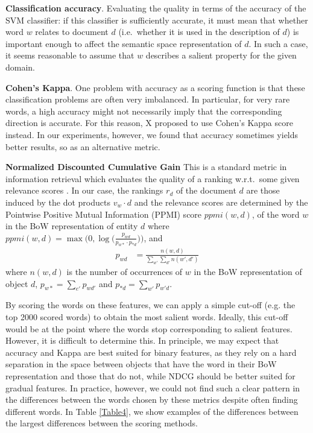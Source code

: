 \noindent \textbf{Classification accuracy}. Evaluating the quality in terms of the accuracy of the SVM classifier: if this classifier is sufficiently accurate, it must mean that whether word $w$ relates to document $d$ (i.e.\ whether it is used in the description of $d$) is important enough to affect the semantic space representation of $d$. In such a case, it seems reasonable to assume that $w$ describes a salient property for the given domain.%
\smallskip

\noindent \textbf{Cohen's Kappa}. One problem with accuracy as a scoring function is that these classification problems are often very imbalanced. In particular, for very rare words, a high accuracy might not necessarily imply that the corresponding direction is accurate. For this reason, X proposed to use Cohen's Kappa score instead. In our experiments, however, we found that accuracy sometimes yields better results, so  as an alternative metric. %
\smallskip

\noindent \textbf{Normalized Discounted Cumulative Gain} %
This is a standard metric in information retrieval which evaluates the quality of a ranking w.r.t.\ some given relevance scores \cite{jarvelin2002cumulated}.  In our case, the rankings $r_d$ of the document $d$ are those induced by the dot products $v_w \cdot d$ and the relevance scores are determined by the Pointwise Positive Mutual Information (PPMI) score $\textit{ppmi}(w,d)$, of the word $w$ in the BoW representation of entity $d$ where
$\textit{ppmi}(w,d) = \max \big(0, \log\big(\frac{p_{wd}}{p_{w*} \cdotp p_{*d}}\big)\big)$, and
\begin{align*}
p_{wd} &= \frac{n(w, d)}{\sum_{w'} \sum_{d'} n(w', d')}
\end{align*}
where $n(w,d)$ is the number of occurrences of $w$ in the BoW representation of object $d$, $p_{w*} = \sum_{e'} p_{wd'}$ and $p_{*d} = \sum_{w'} p_{w'd}$. %
\smallskip

By scoring the words on these features, we can apply a simple cut-off (e.g. the top 2000 scored words) to obtain the most salient words. Ideally, this cut-off would be at the point where the words stop corresponding to salient features. However, it is difficult to determine this. In principle, we may expect that accuracy and Kappa are best suited for binary features, as they rely on a hard separation in the space between objects that have the word in their BoW representation and those that do not, while NDCG should be better suited for gradual features. In practice, however, we could not find such a clear pattern in the differences between the words chosen by these metrics despite often finding different words. In Table \ref{Table4}, we show examples of the differences between the largest differences between the scoring methods. %


